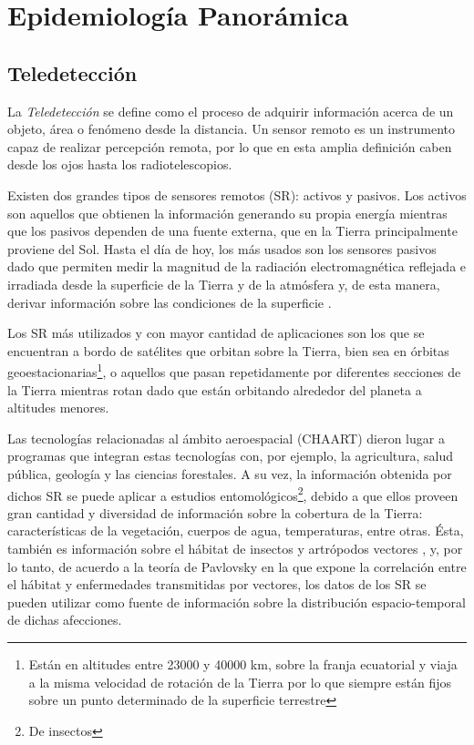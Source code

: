 



\section{Epidemiología Panorámica}

\justifying

\subsection{Teledetección}

\par La \textit{Teledetección} se define como el proceso de adquirir
  información acerca de un objeto, área o fenómeno desde la distancia.
  Un sensor remoto es un instrumento capaz de realizar percepción remota, por lo
  que en esta amplia definición caben desde los ojos hasta los
  radiotelescopios.

\par Existen dos grandes tipos de sensores remotos (SR): activos y pasivos.
  Los activos son aquellos que obtienen la información generando su propia energía
  mientras que los pasivos dependen de una fuente externa, que en la Tierra
  principalmente proviene del Sol. Hasta el día de hoy, los más usados son los
  sensores pasivos dado que permiten medir la magnitud de la radiación electromagnética
  reflejada e irradiada desde la superficie de la Tierra y de la atmósfera y,
  de esta manera, derivar información sobre las condiciones de la superficie \cite{cami_tartagal}.


\par Los SR más utilizados y con mayor cantidad de aplicaciones son los que se
  encuentran a bordo de satélites que orbitan sobre la Tierra, bien sea
  en órbitas geoestacionarias\footnote{Están en altitudes entre 23000 y 40000 km,
  sobre la franja ecuatorial y viaja a la misma velocidad de rotación de la Tierra
  por lo que siempre están fijos sobre un punto determinado de la superficie terrestre},
  o aquellos que pasan repetidamente por diferentes secciones de la Tierra mientras
  rotan dado que están orbitando alrededor del planeta a altitudes menores.


\par Las tecnologías relacionadas al ámbito aeroespacial (CHAART) dieron lugar a programas
  que integran estas tecnologías con, por ejemplo, la agricultura, salud pública,
  geología y las ciencias forestales.
  A su vez, la información obtenida por dichos SR se puede aplicar a estudios
  entomológicos\footnote{De insectos}, debido a que ellos proveen gran cantidad
  y diversidad de información sobre la cobertura de la Tierra: características
  de la vegetación, cuerpos de agua, temperaturas, entre otras. Ésta, también es
  información sobre el hábitat de insectos y artrópodos vectores \cite{estallo_ndwi, data_driven_prediction},
  y, por lo tanto, de acuerdo a la teoría de Pavlovsky \cite{pavloskiy} en la que
  expone la correlación entre el hábitat y enfermedades transmitidas por vectores,
  los datos de los SR se pueden utilizar como fuente de información sobre la
  distribución espacio-temporal de dichas afecciones.



